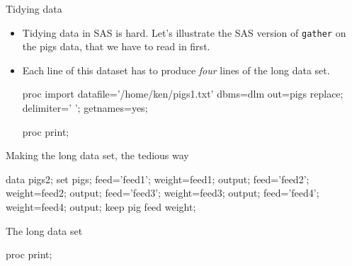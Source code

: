\documentclass[unknownkeysallowed]{beamer}\usepackage[]{graphicx}\usepackage[]{color}
\begin{document}
\begin{frame}[fragile]{Tidying data}
  
  \begin{itemize}
  \item Tidying data in SAS is hard. Let's illustrate the SAS version
    of \texttt{gather} on the pigs data, that we have to read in first.
  \item Each line of this dataset has to produce \emph{four} lines
    of the long data set. 
    
    \begin{Datastep}
proc import 
  datafile='/home/ken/pigs1.txt'
  dbms=dlm out=pigs replace;
  delimiter=' ';
  getnames=yes;
    \end{Datastep}
    
    \begin{Sascode}[store=tn]
proc print;      
    \end{Sascode}
    
    
  \end{itemize}
  
\end{frame}

\begin{frame}[fragile]{Making the long data set, the tedious way}
  
  \begin{Datastep}
data pigs2;
  set pigs;
  feed='feed1';
  weight=feed1;
  output;
  feed='feed2';
  weight=feed2;
  output;
  feed='feed3';
  weight=feed3;
  output;
  feed='feed4';
  weight=feed4;
  output;
  keep pig feed weight;
  \end{Datastep}
  
\end{frame}

\begin{frame}[fragile]{The long data set}
  
  \begin{Sascode}[store=to]
proc print;    
  \end{Sascode}
  
  
\end{frame}
\end{document}
